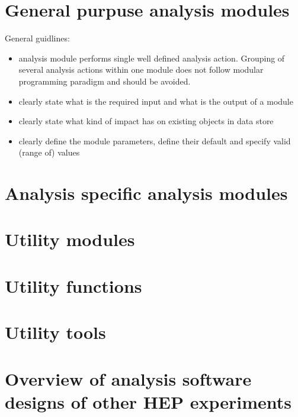 \documentclass[a4paper,11pt]{article}
\begin{document}






\newpage
\section{General purpuse analysis modules}

General guidlines:
\begin{itemize}
 \item analysis module performs single well defined analysis action. Grouping of several analysis actions within one 
 module does not follow modular programming paradigm and should be avoided.
 \item clearly state what is the required input and what is the output of a module
 \item clearly state what kind of impact has on existing objects in data store
 \item clearly define the module parameters, define their default and specify valid (range of) values
\end{itemize}








\section{Analysis specific analysis modules}

\section{Utility modules}


\section{Utility functions}

\section{Utility tools}


\section{Overview of analysis software designs of other HEP experiments}




\end{document}
